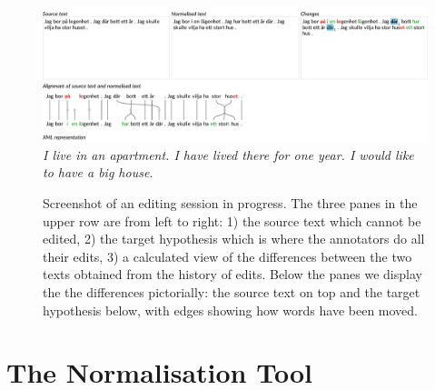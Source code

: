\documentclass[10pt, a4paper]{article}
\newcommand{\dan}[1]{{\color{Fuchsia}{Dan: #1}}}
\newcommand{\elena}[1]{{\color{BrickRed}{Elena: #1}}}
\newcommand{\mats}[1]{{\color{Blue}{Mats: #1}}}
\begin{document}
\begin{figure}
\includegraphics[width=\textwidth, trim={0 1.3cm 0 0}, clip]{screenshot.pdf}
\emph{\small I live in an apartment. I have lived there for one year. I would like to have a big house.}
\caption{Screenshot of an editing session in progress. The three panes in the upper row are from left to right:
1) the source text which cannot be edited,
2) the target hypothesis which is where the annotators do all their edits,
3) a calculated view of the differences between the two texts obtained from the history of edits.
Below the panes we display the the differences pictorially:
the source text on top and the target hypothesis below, with edges
showing how words have been moved.
\label{fig:screenshot}
}
\end{figure}


\section{The Normalisation Tool}
\label{sec:norm_tool}
\end{document}

